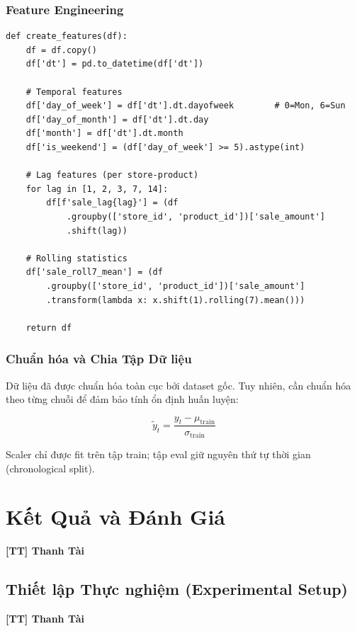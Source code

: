\documentclass[12pt,a4paper]{report}
\newcommand{\ownerTT}{\colorbox{red!15}{\textbf{[TT] Thanh Tài}}}
\begin{document}
\subsection{Feature Engineering}

\begin{lstlisting}[caption=Tạo đặc trưng cho mô hình]
def create_features(df):
    df = df.copy()
    df['dt'] = pd.to_datetime(df['dt'])

    # Temporal features
    df['day_of_week'] = df['dt'].dt.dayofweek        # 0=Mon, 6=Sun
    df['day_of_month'] = df['dt'].dt.day
    df['month'] = df['dt'].dt.month
    df['is_weekend'] = (df['day_of_week'] >= 5).astype(int)

    # Lag features (per store-product)
    for lag in [1, 2, 3, 7, 14]:
        df[f'sale_lag{lag}'] = (df
            .groupby(['store_id', 'product_id'])['sale_amount']
            .shift(lag))

    # Rolling statistics
    df['sale_roll7_mean'] = (df
        .groupby(['store_id', 'product_id'])['sale_amount']
        .transform(lambda x: x.shift(1).rolling(7).mean()))

    return df
\end{lstlisting}

\subsection{Chuẩn hóa và Chia Tập Dữ liệu}

Dữ liệu đã được chuẩn hóa toàn cục bởi dataset gốc. Tuy nhiên, cần chuẩn hóa theo từng chuỗi để đảm bảo tính ổn định huấn luyện:

\[
\tilde{y}_t = \frac{y_t - \mu_{\text{train}}}{\sigma_{\text{train}}}
\]

Scaler chỉ được fit trên tập train; tập eval giữ nguyên thứ tự thời gian (chronological split).

\newpage

\chapter{Kết Quả và Đánh Giá}
\ownerTT

\section{Thiết lập Thực nghiệm (Experimental Setup)}
\ownerTT
\end{document}
